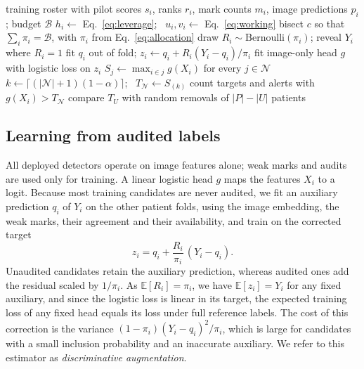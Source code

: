 \begin{algorithm}[t]
\caption{Paired-tail audit and score-fixed reference replay}
\label{alg:audit}
\small
\begin{algorithmic}[1]
\Require training roster with pilot scores $s_i$, ranks $r_i$, mark counts $m_i$, image predictions $p_i$; budget $\mathcal B$
\State $h_i\gets$ Eq.~\eqref{eq:leverage}; \ $u_i,v_i\gets$ Eq.~\eqref{eq:working}
\State bisect $c$ so that $\sum_i\pi_i=\mathcal B$, with $\pi_i$ from Eq.~\eqref{eq:allocation}
\State draw $R_i\sim\mathrm{Bernoulli}(\pi_i)$; reveal $Y_i$ where $R_i=1$
\State fit $q_i$ out of fold; $z_i\gets q_i+R_i(Y_i-q_i)/\pi_i$
\State fit image-only head $g$ with logistic loss on $z_i$
 
\State $S_j\gets\max_{i\in j} g(X_i)$ for every $j\in\mathcal N$
\State $k\gets\lceil(|\mathcal N|+1)(1-\alpha)\rceil$; \ $T_{\mathcal N}\gets S_{(k)}$
\State count targets and alerts with $g(X_i)>T_{\mathcal N}$
\EndFor
\State compare $T_U$ with \NRandom{} random removals of $|P|-|U|$ patients
\end{algorithmic}
\end{algorithm}

\subsection{Learning from audited labels}
\label{sec:training}

All deployed detectors operate on image features alone; weak marks and audits are used only for training. A linear logistic head $g$ maps the features $X_i$ to a logit. Because most training candidates are never audited, we fit an auxiliary prediction $q_i$ of $Y_i$ on the other patient folds, using the image embedding, the weak marks, their agreement and their availability, and train on the corrected target
\begin{equation}
 z_i=q_i+\frac{R_i}{\pi_i}\,(Y_i-q_i).
 \label{eq:augmentation}
\end{equation}
Unaudited candidates retain the auxiliary prediction, whereas audited ones add the residual scaled by $1/\pi_i$. As $\mathbb E[R_i]=\pi_i$, we have $\mathbb E[z_i]=Y_i$ for any fixed auxiliary, and since the logistic loss is linear in its target, the expected training loss of any fixed head equals its loss under full reference labels. The cost of this correction is the variance $(1-\pi_i)(Y_i-q_i)^2/\pi_i$, which is large for candidates with a small inclusion probability and an inaccurate auxiliary. We refer to this estimator as \emph{discriminative augmentation}.

